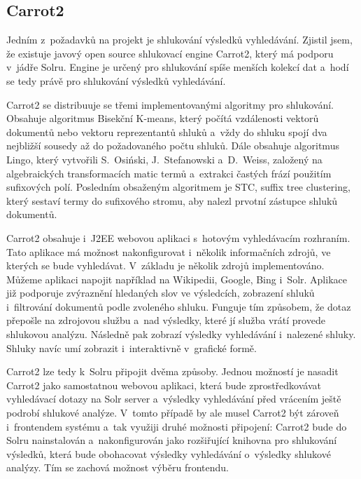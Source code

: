 \subsection{Carrot2}
Jedním z~požadavků na projekt je shlukování výsledků vyhledávání. Zjistil jsem, že existuje javový open source shlukovací engine Carrot2\cite{carrot2:manual}, který má podporu v~jádře Solru. Engine je určený pro shlukování spíše menších kolekcí dat a~hodí se tedy právě pro shlukování výsledků vyhledávání.

Carrot2 se distribuuje se třemi implementovanými algoritmy pro shlukování. Obsahuje algoritmus Bisekční K-means, který počítá vzdálenosti vektorů dokumentů nebo vektoru reprezentantů shluků a~vždy do shluku spojí dva nejbližší sousedy až do požadovaného počtu shluků. Dále obsahuje algoritmus Lingo, který vytvořili S.~Osiński, J.~Stefanowski a~D.~Weiss, založený na algebraických transformacích matic termů a~extrakci častých frází použitím sufixových polí. Posledním obsaženým algoritmem je STC, suffix tree clustering, který sestaví termy do sufixového stromu, aby nalezl prvotní zástupce shluků dokumentů.

Carrot2 obsahuje i~J2EE webovou aplikaci s~hotovým vyhledávacím rozhraním. Tato aplikace má možnost nakonfigurovat i~několik informačních zdrojů, ve kterých se bude vyhledávat. V~základu je několik zdrojů implementováno. Můžeme aplikaci napojit například na Wikipedii, Google, Bing i~Solr. Aplikace již podporuje zvýraznění hledaných slov ve výsledcích, zobrazení shluků i~filtrování dokumentů podle zvoleného shluku. Funguje tím způsobem, že dotaz přepošle na zdrojovou službu a~nad výsledky, které jí služba vrátí provede shlukovou analýzu. Následně pak zobrazí výsledky vyhledávání i~nalezené shluky. Shluky navíc umí zobrazit i~interaktivně v~grafické formě.

Carrot2 lze tedy k~Solru připojit dvěma způsoby. Jednou možností je nasadit Carrot2 jako samostatnou webovou aplikaci, která bude zprostředkovávat vyhledávací dotazy na Solr server a~výsledky vyhledávání před vrácením ještě podrobí shlukové analýze. V~tomto případě by ale musel Carrot2 být zároveň i~frontendem systému a~tak využiji druhé možnosti připojení: Carrot2 bude do Solru nainstalován a~nakonfigurován jako rozšiřující knihovna pro shlukování výsledků, která bude obohacovat výsledky vyhledávání o~výsledky shlukové analýzy. Tím se zachová možnost výběru frontendu.